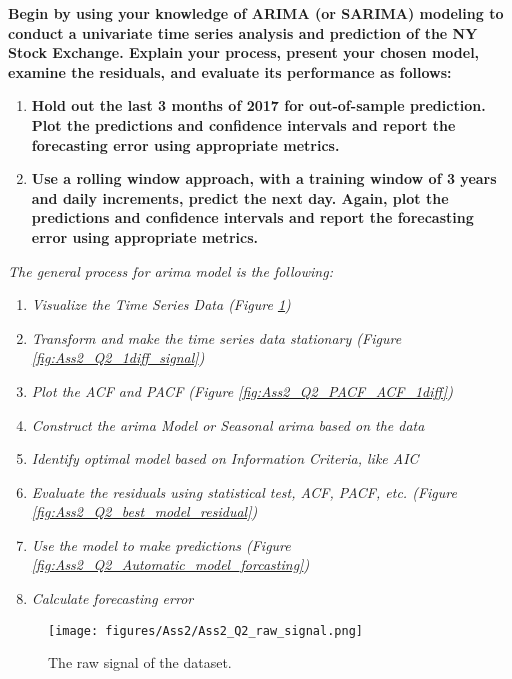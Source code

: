 \item \textbf{Begin by using your knowledge of ARIMA (or SARIMA) modeling to conduct a univariate time series analysis and prediction of the NY Stock Exchange. Explain your process, present your chosen model, examine the residuals, and evaluate its performance as follows:} 
\begin{enumerate}
\item \textbf{Hold out the last 3 months of 2017 for out-of-sample prediction. Plot the predictions and confidence intervals and report the forecasting error using appropriate metrics.}
\item \textbf{Use a rolling window approach, with a training window of 3 years and daily increments, predict the next day. Again, plot the predictions and confidence intervals and report the forecasting error using appropriate metrics.}
\end{enumerate}






\textit{ The general process for \gls{arima} model is the following:}
\begin{enumerate}
\item \textit{Visualize the Time Series Data (Figure
        \ref{fig:Ass2_Q2_raw_signal})}
\item \textit{Transform and make the time series data stationary (Figure
        \ref{fig:Ass2_Q2_1diff_signal})}
\item \textit{Plot the \gls{ACF} and \gls{PACF} (Figure
        \ref{fig:Ass2_Q2_PACF_ACF_1diff})}
\item \textit{Construct the \gls{arima} Model or Seasonal \gls{arima} based on the data }
\item \textit{Identify optimal model based on Information Criteria, like \gls{AIC} }
\item \textit{Evaluate the residuals using statistical test, \gls{ACF}, \gls{PACF}, etc. (Figure
         \ref{fig:Ass2_Q2_best_model_residual})}
\item \textit{Use the model to make predictions (Figure
        \ref{fig:Ass2_Q2_Automatic_model_forcasting})}
\item \textit{Calculate forecasting error}


\end{enumerate}


\begin{figure}[H]
    \centering
    \begin{minipage}[b]{1\textwidth}
        \texttt{[image: figures/Ass2/Ass2\_Q2\_raw\_signal.png]}
    \end{minipage}
    \caption{The raw signal of the dataset.}
    \label{fig:Ass2_Q2_raw_signal}
\end{figure}

